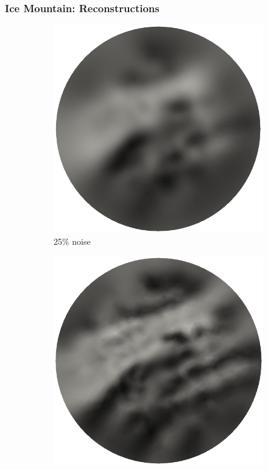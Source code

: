 \documentclass[10pt,final,xcolor=dvipsnames]{beamer}
\begin{document}
\begin{frame}
	\frametitle{Ice Mountain: Reconstructions}
\begin{figure}
	\begin{subfigure}{0.32\textwidth}
		\includegraphics[scale=0.17]{mstar_0.25noise_cropped.png}
		\caption{25\% noise}
	\end{subfigure}
	\begin{subfigure}{0.32\textwidth}
		\includegraphics[scale=0.17]{mstar_0.05noise_cropped.png}

\end{subfigure}
\end{figure}
\end{frame}
\end{document}

